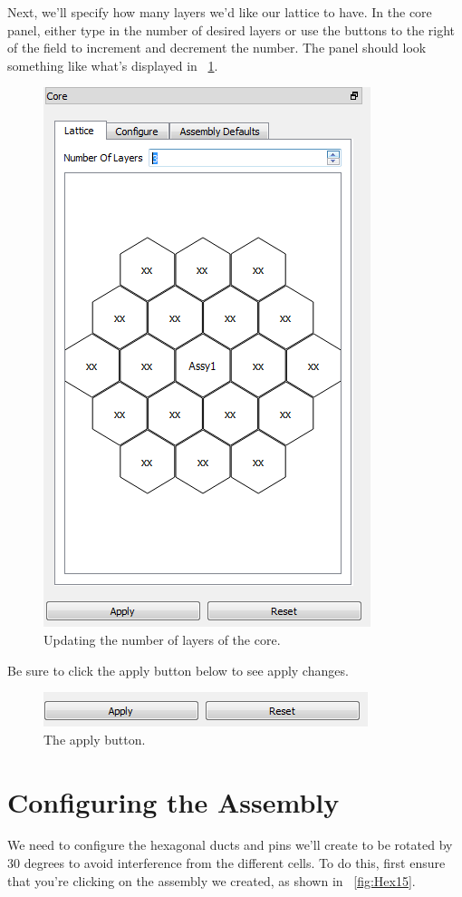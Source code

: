 Next, we'll specify how many layers we'd like our lattice to have.  In the core panel, either type in the number of desired layers or use the buttons to the right of the field to increment and decrement the number.  The panel should look something like what's displayed in ~\ref{fig:Hex3}.

\begin{figure}[H]
	\begin{center}
		\includegraphics[width=0.5\linewidth]{Images/hex-3.png}
		\caption{Updating the number of layers of the core.}
		\label{fig:Hex3}
	\end{center}
\end{figure}

Be sure to click the apply button below to see apply changes.

\begin{figure}[H]
	\begin{center}
		\includegraphics[width=0.5\linewidth]{Images/hex-4.png}
		\caption{The apply button.}
		\label{fig:Hex4}
	\end{center}
\end{figure}

\section{Configuring the Assembly}
\label{section:RotateAssembly30}
We need to configure the hexagonal ducts and pins we'll create to be rotated by 30 degrees to avoid interference from the different cells.  To do this, first ensure that you're clicking on the assembly we created, as shown in ~\ref{fig:Hex15}.

